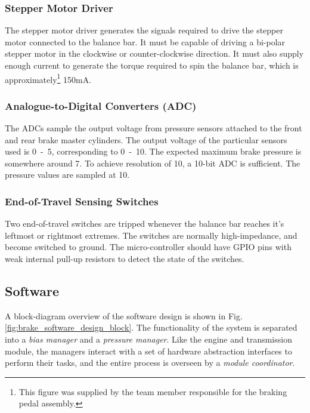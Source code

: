 \subsubsection{Stepper Motor Driver}

The stepper motor driver generates the signals required to drive the stepper motor connected to the balance bar. It must be capable of  driving a bi-polar stepper motor in the clockwise or counter-clockwise direction. It must also supply enough current to generate the torque required to spin the balance bar, which is approximately\footnote{This figure was supplied by the team member responsible for the braking pedal assembly.} \unit{150}{mA}.

\subsubsection{Analogue-to-Digital Converters (ADC)}

The ADCs sample the output voltage from pressure sensors attached to the front and rear brake master cylinders. The output voltage of the particular sensors used is \unit{0-5}{\volt}, corresponding to \unit{0-10}{\mega\pascal}. The expected maximum brake pressure is somewhere around \unit{7}{\mega\pascal}. To achieve resolution of \unit{10}{\kilo\pascal}, a 10-bit ADC is sufficient. The pressure values are sampled at \unit{10}{\hertz}.

\subsubsection{End-of-Travel Sensing Switches}

Two end-of-travel switches are tripped whenever the balance bar reaches it's leftmost or rightmost extremes. The switches are normally high-impedance, and become switched to ground. The micro-controller should have GPIO pins with weak internal pull-up resistors to detect the state of the switches.

\subsection{Software}

A block-diagram overview of the software design is shown in Fig. \ref{fig:brake_software_design_block}. The functionality of the system is separated into a \emph{bias manager} and a \emph{pressure manager}. Like the engine and transmission module, the managers interact with a set of hardware abstraction interfaces to perform their tasks, and the entire process is overseen by a \emph{module coordinator}.

